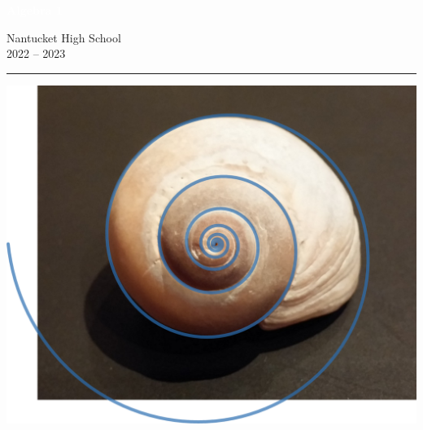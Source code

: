 \documentclass{tstextbook}
\begin{document}
\begin{titlepage}
\BgThispage
{}
\vspace*{0.4\textheight}
\noindent
\textcolor{white}{\Huge\textbf{\textsf{Algebra 1}}}
\vspace*{2cm}\par
\noindent
\begin{minipage}{0.35\linewidth}
    \begin{flushright}
    Nantucket High School \\
    2022 -- 2023
    \end{flushright}
\end{minipage} \hspace{15pt}
%
\begin{minipage}{0.02\linewidth}
    \rule{1pt}{175pt}
\end{minipage} \hspace{-10pt}
%
\begin{minipage}{0.63\linewidth}
\vspace{5pt}
%  
\hspace{35mm}
\includegraphics[width=1.0\textwidth]{img/shell.png}
\end{minipage}
\end{titlepage}

\newpage

\end{document}
